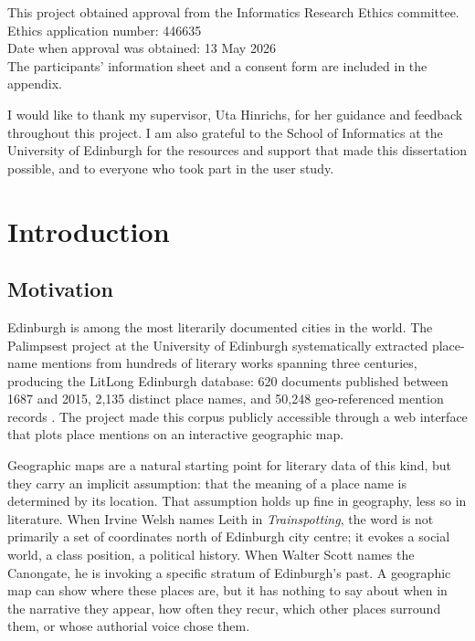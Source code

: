 \documentclass[logo,msc]{infthesis}
\begin{document}
\begin{preliminary}
\begin{ethics}
This project obtained approval from the Informatics Research Ethics committee.\\
Ethics application number: 446635\\
Date when approval was obtained: 13 May 2026\\
The participants' information sheet and a consent form are included in the appendix.\\
\standarddeclaration
\end{ethics}
 
\begin{acknowledgements}
I would like to thank my supervisor, Uta Hinrichs, for her guidance and feedback throughout this project. I am also grateful to the School of Informatics at the University of Edinburgh for the resources and support that made this dissertation possible, and to everyone who took part in the user study.
\end{acknowledgements}
 
\tableofcontents
\listoffigures
 
\end{preliminary}
 
 
\chapter{Introduction}
\label{chap:intro}

\section{Motivation}
 
Edinburgh is among the most literarily documented cities in the world. The Palimpsest project at the University of Edinburgh systematically extracted place-name mentions from hundreds of literary works spanning three centuries, producing the LitLong Edinburgh database: 620 documents published between 1687 and 2015, 2,135 distinct place names, and 50,248 geo-referenced mention records \cite{anderson2016}. The project made this corpus publicly accessible through a web interface that plots place mentions on an interactive geographic map.
 
Geographic maps are a natural starting point for literary data of this kind, but they carry an implicit assumption: that the meaning of a place name is determined by its location. That assumption holds up fine in geography, less so in literature. When Irvine Welsh names Leith in \textit{Trainspotting}, the word is not primarily a set of coordinates north of Edinburgh city centre; it evokes a social world, a class position, a political history. When Walter Scott names the Canongate, he is invoking a specific stratum of Edinburgh's past. A geographic map can show where these places are, but it has nothing to say about when in the narrative they appear, how often they recur, which other places surround them, or whose authorial voice chose them.
\end{document}
